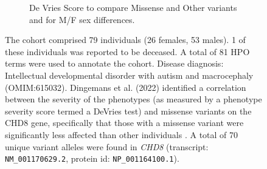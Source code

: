 \begin{figure}[htbp]
\vspace{2em}

\begin{subfigure}[b]{0.95\textwidth}
\captionsetup{justification=raggedright,singlelinecheck=false}
\caption{De Vries Score to compare Missense and Other variants and for M/F sex differences. }
\end{subfigure}


\vspace{2em}

\caption{ The cohort comprised 79 individuals (26 females, 53 males). 1 of these individuals was reported to be deceased. 
A total of 81 HPO terms were used to annotate the cohort. Disease diagnosis: Intellectual developmental disorder with autism and macrocephaly 
(OMIM:615032).  Dingemans et al. (2022) identified a correlation between the severity of the phenotypes (as measured by a phenotype severity score termed a DeVries test) and missense variants on the CHD8 gene, 
specifically that those with a missense variant were significantly less affected than other individuals \cite{PMID_36182950}.
A total of 70 unique variant alleles were found in \textit{CHD8} (transcript: \texttt{NM\_001170629.2}, protein id: \texttt{NP\_001164100.1}).}
\end{figure}
